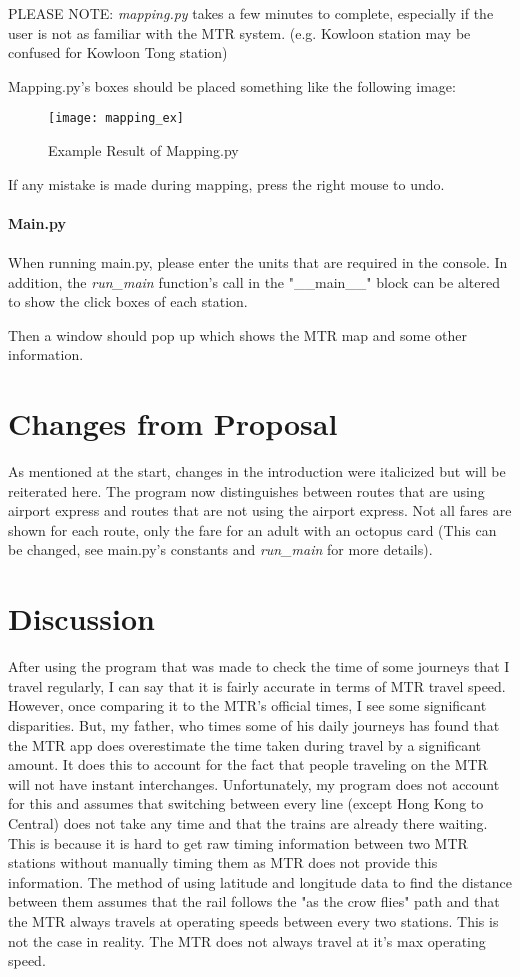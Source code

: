\documentclass[fontsize=11pt]{article}
\begin{document}
PLEASE NOTE: \textit{mapping.py} takes a few minutes to complete, especially if the user is not as familiar with the MTR system. (e.g. Kowloon station may be confused for Kowloon Tong station)

Mapping.py's boxes should be placed something like the following image:
\begin{figure}[h]
		\caption{Example Result of Mapping.py}
	    \texttt{[image: mapping\_ex]}
	    \centering
\end{figure}

If any mistake is made during mapping, press the right mouse to undo.
\\\\
\textbf{Main.py}\\\\
When running main.py, please enter the units that are required in the console. In addition, the \textit{run\_main} function's call in the "\_\_main\_\_" block can be altered to show the click boxes of each station.  

Then a window should pop up which shows the MTR map and some other information.

\section*{Changes from Proposal}
As mentioned at the start, changes in the introduction were italicized but will be reiterated here. 
The program now distinguishes between routes that are using airport express and routes that are not using the airport express. Not all fares are shown for each route, only the fare for an adult with an octopus card (This can be changed, see main.py's constants and \textit{run\_main} for more details).

\section*{Discussion}
After using the program that was made to check the time of some journeys that I travel regularly, I can say that it is fairly accurate in terms of MTR travel speed. However, once comparing it to the MTR's official times, I see some significant disparities. But, my father, who times some of his daily journeys has found that the MTR app does overestimate the time taken during travel by a significant amount. It does this to account for the fact that people traveling on the MTR will not have instant interchanges. Unfortunately, my program does not account for this and assumes that switching between every line (except Hong Kong to Central) does not take any time and that the trains are already there waiting. This is because it is hard to get raw timing information between two MTR stations without manually timing them as MTR does not provide this information. The method of using latitude and longitude data to find the distance between them assumes that the rail follows the "as the crow flies" path and that the MTR always travels at operating speeds between every two stations. This is not the case in reality. The MTR does not always travel at it's max operating speed. 
\end{document}
